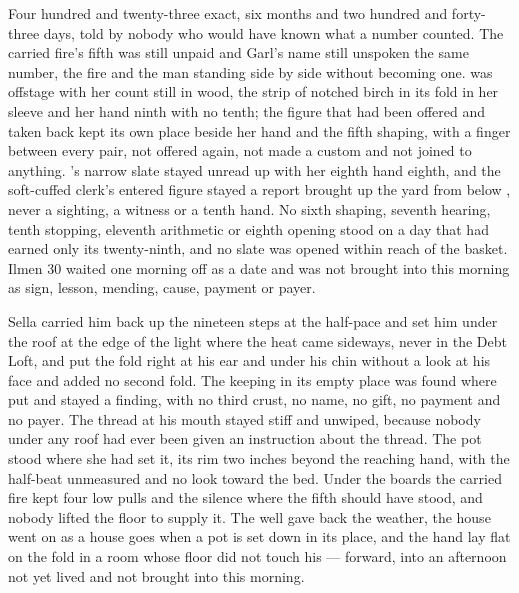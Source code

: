Four hundred and twenty-three exact, six months and two hundred and forty-three days, told by nobody who would have known what a number counted. The carried fire's fifth was still unpaid and Garl's name still unspoken the same number, the fire and the man standing side by side without becoming one.  was offstage with her count still in wood, the strip of notched birch in its fold in her sleeve and her hand ninth with no tenth; the figure that had been offered and taken back kept its own place beside her hand and the fifth shaping, with a finger between every pair, not offered again, not made a custom and not joined to anything. 's narrow slate stayed unread up  with her eighth hand eighth, and the soft-cuffed clerk's entered figure stayed a report brought up the yard from  below , never a sighting, a witness or a tenth hand. No sixth shaping, seventh hearing, tenth stopping, eleventh arithmetic or eighth opening stood on a day that had earned only its twenty-ninth, and no slate was opened within reach of the basket. Ilmen 30 waited one morning off as a date and was not brought into this morning as sign, lesson, mending, cause, payment or payer.

Sella carried him back up the nineteen steps at the half-pace and set him under the roof at the edge of the light where the heat came sideways, never in the Debt Loft, and put the fold right at his ear and under his chin without a look at his face and added no second fold. The keeping in its empty place was found where put and stayed a finding, with no third crust, no name, no gift, no payment and no payer. The thread at his mouth stayed stiff and unwiped, because nobody under any roof had ever been given an instruction about the thread. The pot stood where she had set it, its rim two inches beyond the reaching hand, with the half-beat unmeasured and no look toward the bed. Under the boards the carried fire kept four low pulls and the silence where the fifth should have stood, and nobody lifted the floor to supply it. The well gave back the weather, the house went on as a house goes when a pot is set down in its place, and the hand lay flat on the fold in a room whose floor did not touch his --- forward, into an afternoon not yet lived and not brought into this morning.

